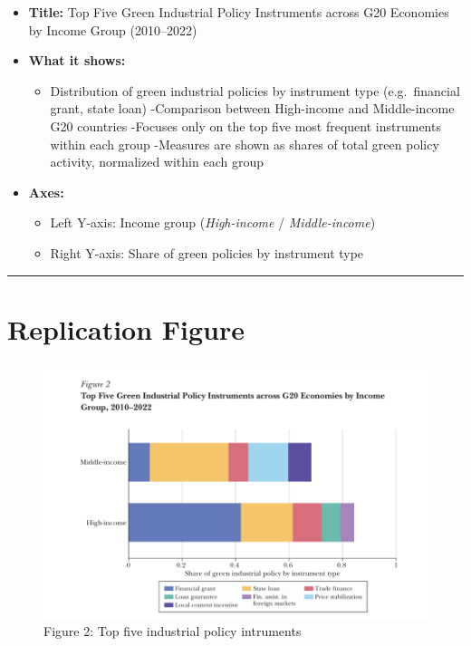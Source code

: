 \documentclass[
  letterpaper,
  DIV=11,
  numbers=noendperiod]{scrartcl}
\providecommand{\tightlist}{%
  \setlength{\itemsep}{0pt}\setlength{\parskip}{0pt}}
\begin{document}
\begin{itemize}
\tightlist
\item
  \textbf{Title:} Top Five Green Industrial Policy Instruments across
  G20 Economies by Income Group (2010--2022)
\item
  \textbf{What it shows:}

  \begin{itemize}
  \tightlist
  \item
    Distribution of green industrial policies by instrument type
    (e.g.~financial grant, state loan) -Comparison between High-income
    and Middle-income G20 countries -Focuses only on the top five most
    frequent instruments within each group -Measures are shown as shares
    of total green policy activity, normalized within each group
  \end{itemize}
\item
  \textbf{Axes:}

  \begin{itemize}
  \tightlist
  \item
    Left Y-axis: Income group (\emph{High-income} /
    \emph{Middle-income})\\
  \item
    Right Y-axis: Share of green policies by instrument type
  \end{itemize}
\end{itemize}

\begin{center}\rule{0.5\linewidth}{0.5pt}\end{center}

\section{Replication Figure}\label{replication-figure-1}

\begin{figure}[H]

{\centering \includegraphics[width=1\linewidth,height=\textheight,keepaspectratio]{index_files/mediabag/figure_2.png}

}

\caption{Figure 2: Top five industrial policy intruments}

\end{figure}%
\end{document}
